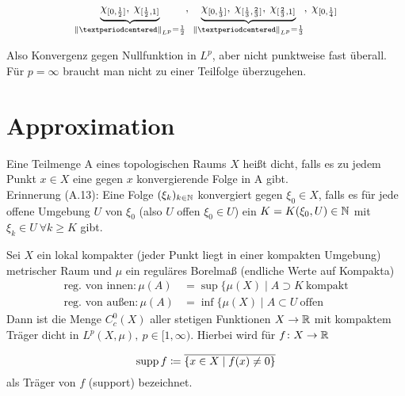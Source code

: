 \documentclass[skript.tex]{subfiles}
\begin{document}
\begin{bsp}[Raumschiff]
	\begin{equation*}
	\underbrace{\chi_{[0,\frac{1}{2}]}, \: \chi_{[\frac{1}{2},1]}}_{\norm{·}_{L^p}=\frac{1}{2}}, \: \underbrace{\chi_{[0,\frac{1}{3}]}, \: \chi_{[\frac{1}{3},\frac{2}{3}]}, \: \chi_{[\frac{2}{3},1]}}_{\norm{·}_{L^p}=\frac{1}{3}}, \: \chi_{[0,\frac{1}{4}]}
	\end{equation*}
	
	Also Konvergenz gegen Nullfunktion in $L^p$, aber nicht punktweise fast überall. Für $p= \infty$ braucht man nicht zu einer Teilfolge überzugehen.
\end{bsp}

\section{Approximation}

\begin{defin}
	Eine Teilmenge A eines topologischen Raums $X$ heißt dicht, falls es zu jedem Punkt $x\in X$ eine gegen $x$ konvergierende Folge in A gibt. \\
	Erinnerung (A.13): Eine Folge $(\xi_k)_{k\in\mathbb{N}}$ konvergiert gegen $\xi_0 \in X$, falls es für jede offene Umgebung $U$ von $\xi_0$ (also $U$ offen $\xi_0 \in U$) ein $K = K(\xi_0,U) \in \mathbb{N}$ mit $\xi_k \in U \: \forall k \geq K$ gibt.
\end{defin}

\begin{theorem}
	Sei $X$ ein lokal kompakter (jeder Punkt liegt in einer kompakten Umgebung) metrischer Raum und $\mu$ ein reguläres Borelmaß (endliche Werte auf Kompakta)
	\begin{align*}
    \text{reg. von innen} \colon \mu(A) &= \sup\{\mu(X) \mid A \supset K \: \text{kompakt} \\
    \text{reg. von außen} \colon \mu(A) &= \inf\{\mu(X) \mid A \subset U \: \text{offen}
	\end{align*}
	Dann ist die Menge $C_c^0(X)$ aller stetigen Funktionen $X \to \mathbb{R}$ mit kompaktem Träger dicht in $L^p(X,\mu), \: p\in [1, \infty)$. Hierbei wird für $f \colon X \to \mathbb{R}$ 
	
	\begin{equation*}
	\operatorname{supp} f \coloneqq  \overline{\{x\in X \mid f(x) \neq0 \}}
	\end{equation*}
	als Träger von $f$ (support) bezeichnet.
\end{theorem}
\end{document}
